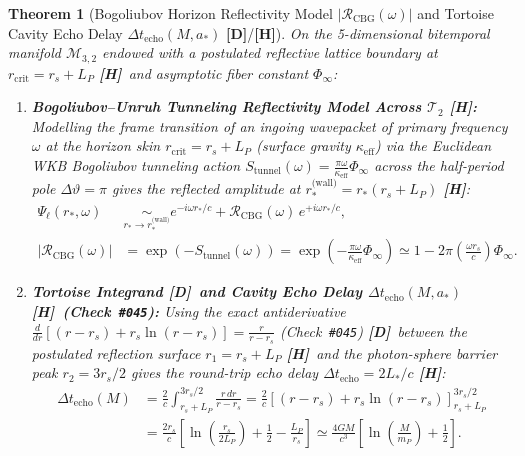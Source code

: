 \documentclass[11pt,a4paper]{article}
\newcommand{\catD}{\textbf{\textcolor{blue!75!black}{[D]}}}
\newcommand{\catH}{\textbf{\textcolor{orange!85!black}{[H]}}}
\theoremstyle{plain}
\newtheorem{theorem}{Theorem}[section]
\theoremstyle{definition}
\theoremstyle{remark}
\numberwithin{equation}{section}
\begin{document}
\begin{theorem}[Bogoliubov Horizon Reflectivity Model $|\mathcal{R}_{\text{CBG}}(\omega)|$ and Tortoise Cavity Echo Delay $\Delta t_{\text{echo}}(M, a_*)$ \catD/\catH]
\label{thm:bogoliubov_echo_cavity}
On the 5-dimensional bitemporal manifold $\mathcal{M}_{3,2}$ endowed with a postulated reflective lattice boundary at $r_{\text{crit}} = r_s + L_P$ \catH\ and asymptotic fiber constant $\Phi_{\infty}$:
\begin{enumerate}
  \item[\textnormal{(i)}] \textbf{Bogoliubov--Unruh Tunneling Reflectivity Model Across $\mathcal{T}_2$ \catH:} Modelling the frame transition of an ingoing wavepacket of primary frequency $\omega$ at the horizon skin $r_{\text{crit}} = r_s + L_P$ (surface gravity $\kappa_{\text{eff}}$) via the Euclidean WKB Bogoliubov tunneling action $S_{\text{tunnel}}(\omega) = \frac{\pi\omega}{\kappa_{\text{eff}}}\Phi_{\infty}$ across the half-period pole $\Delta\vartheta = \pi$ gives the reflected amplitude at $r_*^{\text{(wall)}} = r_*(r_s + L_P)$ \catH:
  \begin{align}
    \Psi_{\ell}\!\left(r_*, \omega\right) &\underset{r_* \to r_*^{\text{(wall)}}}{\sim} e^{-i\omega r_*/c} + \mathcal{R}_{\text{CBG}}(\omega)\,e^{+i\omega r_*/c}, \nonumber \\[3pt]
    \left|\mathcal{R}_{\text{CBG}}(\omega)\right| &= \exp\!\left(-S_{\text{tunnel}}(\omega)\right) = \exp\!\left(-\frac{\pi \omega}{\kappa_{\text{eff}}} \Phi_{\infty}\right) \simeq 1 - 2\pi \left(\frac{\omega r_s}{c}\right) \Phi_{\infty}.
    \label{eq:robin_reflection_coeff}
  \end{align}
  \item[\textnormal{(ii)}] \textbf{Tortoise Integrand \catD\ and Cavity Echo Delay $\Delta t_{\text{echo}}(M, a_*)$ \catH\ (Check~\texttt{\#045}):} Using the exact antiderivative $\frac{d}{dr}[(r - r_s) + r_s\ln(r - r_s)] = \frac{r}{r - r_s}$ (Check~\texttt{\#045}) \catD\ between the postulated reflection surface $r_1 = r_s + L_P$ \catH\ and the photon-sphere barrier peak $r_2 = 3r_s / 2$ gives the round-trip echo delay $\Delta t_{\text{echo}} = 2 L_* / c$ \catH:
  \begin{align}
    \Delta t_{\text{echo}}(M) &= \frac{2}{c} \int_{r_s + L_P}^{3r_s / 2} \frac{r\,dr}{r - r_s} = \frac{2}{c} \left[ \left(r - r_s\right) + r_s \ln\left(r - r_s\right) \right]_{r_s + L_P}^{3r_s / 2} \nonumber\\[4pt]
    &= \frac{2 r_s}{c} \left[ \ln\left(\frac{r_s}{2 L_P}\right) + \frac{1}{2} - \frac{L_P}{r_s} \right] \simeq \frac{4GM}{c^3} \left[ \ln\left(\frac{M}{m_P}\right) + \frac{1}{2} \right].

\end{align}
\end{enumerate}
\end{theorem}
\end{document}
